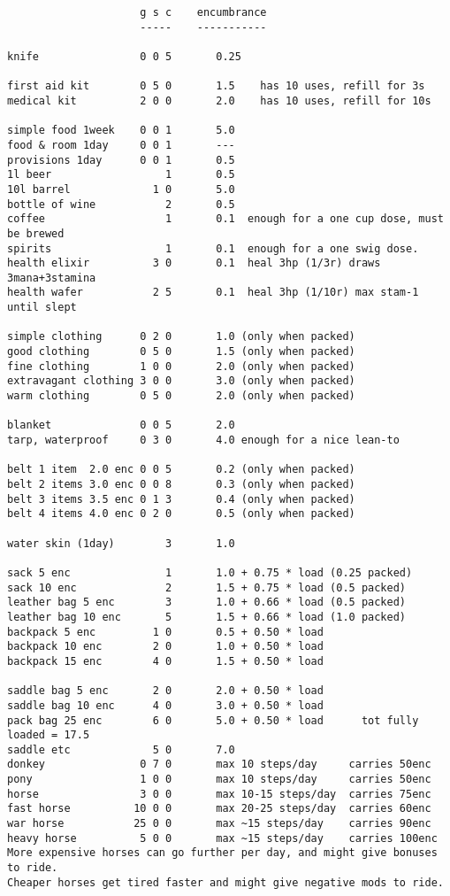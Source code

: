 \small
\pagebreak[1] \begin{verbatim}
                     g s c    encumbrance
                     -----    -----------

knife                0 0 5       0.25

first aid kit        0 5 0       1.5    has 10 uses, refill for 3s
medical kit          2 0 0       2.0    has 10 uses, refill for 10s

simple food 1week    0 0 1       5.0
food & room 1day     0 0 1       ---
provisions 1day      0 0 1       0.5
1l beer                  1       0.5
10l barrel             1 0       5.0
bottle of wine           2       0.5
coffee                   1       0.1  enough for a one cup dose, must be brewed
spirits                  1       0.1  enough for a one swig dose.
health elixir          3 0       0.1  heal 3hp (1/3r) draws 3mana+3stamina
health wafer           2 5       0.1  heal 3hp (1/10r) max stam-1 until slept

simple clothing      0 2 0       1.0 (only when packed)
good clothing        0 5 0       1.5 (only when packed)
fine clothing        1 0 0       2.0 (only when packed)
extravagant clothing 3 0 0       3.0 (only when packed)
warm clothing        0 5 0       2.0 (only when packed)

blanket              0 0 5       2.0
tarp, waterproof     0 3 0       4.0 enough for a nice lean-to

belt 1 item  2.0 enc 0 0 5       0.2 (only when packed)
belt 2 items 3.0 enc 0 0 8       0.3 (only when packed)
belt 3 items 3.5 enc 0 1 3       0.4 (only when packed)
belt 4 items 4.0 enc 0 2 0       0.5 (only when packed)

water skin (1day)        3       1.0

sack 5 enc               1       1.0 + 0.75 * load (0.25 packed)
sack 10 enc              2       1.5 + 0.75 * load (0.5 packed)
leather bag 5 enc        3       1.0 + 0.66 * load (0.5 packed)
leather bag 10 enc       5       1.5 + 0.66 * load (1.0 packed)
backpack 5 enc         1 0       0.5 + 0.50 * load
backpack 10 enc        2 0       1.0 + 0.50 * load
backpack 15 enc        4 0       1.5 + 0.50 * load

saddle bag 5 enc       2 0       2.0 + 0.50 * load
saddle bag 10 enc      4 0       3.0 + 0.50 * load
pack bag 25 enc        6 0       5.0 + 0.50 * load      tot fully loaded = 17.5
saddle etc             5 0       7.0
donkey               0 7 0       max 10 steps/day     carries 50enc
pony                 1 0 0       max 10 steps/day     carries 50enc
horse                3 0 0       max 10-15 steps/day  carries 75enc
fast horse          10 0 0       max 20-25 steps/day  carries 60enc
war horse           25 0 0       max ~15 steps/day    carries 90enc
heavy horse          5 0 0       max ~15 steps/day    carries 100enc
More expensive horses can go further per day, and might give bonuses to ride.
Cheaper horses get tired faster and might give negative mods to ride.


\end{verbatim}
